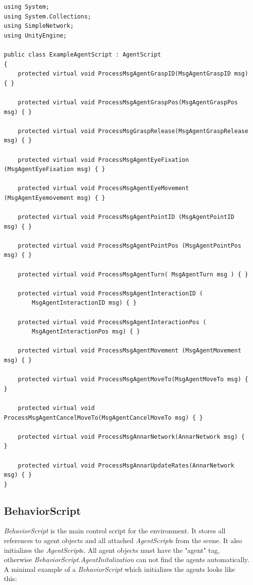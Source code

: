 \documentclass[10pt,final]{scrreprt}
\begin{document}
\begin{lstlisting}
using System;
using System.Collections;
using SimpleNetwork;
using UnityEngine;

public class ExampleAgentScript : AgentScript
{
	protected virtual void ProcessMsgAgentGraspID(MsgAgentGraspID msg) { }

	protected virtual void ProcessMsgAgentGraspPos(MsgAgentGraspPos msg) { }

	protected virtual void ProcessMsgGraspRelease(MsgAgentGraspRelease msg) { }

	protected virtual void ProcessMsgAgentEyeFixation (MsgAgentEyeFixation msg) { }

	protected virtual void ProcessMsgAgentEyeMovement (MsgAgentEyemovement msg) { }
	
	protected virtual void ProcessMsgAgentPointID (MsgAgentPointID msg) { }

	protected virtual void ProcessMsgAgentPointPos (MsgAgentPointPos msg) { }

	protected virtual void ProcessMsgAgentTurn( MsgAgentTurn msg ) { }

	protected virtual void ProcessMsgAgentInteractionID (
		MsgAgentInteractionID msg) { }

	protected virtual void ProcessMsgAgentInteractionPos (
		MsgAgentInteractionPos msg) { }

	protected virtual void ProcessMsgAgentMovement (MsgAgentMovement msg) { }

	protected virtual void ProcessMsgAgentMoveTo(MsgAgentMoveTo msg) { }

	protected virtual void ProcessMsgAgentCancelMoveTo(MsgAgentCancelMoveTo msg) { }
	  
	protected virtual void ProcessMsgAnnarNetwork(AnnarNetwork msg) { }

	protected virtual void ProcessMsgAnnarUpdateRates(AnnarNetwork msg) { }
}
\end{lstlisting}
\subsection{BehaviorScript}

\emph{BehaviorScript} is the main control script for the environment. It stores all references to agent objects and all attached \emph{AgentScript}s from the scene. It also initializes the \emph{AgentScript}s. All agent objects must have the "agent" tag, otherwise \emph{BehaviorScript.AgentInitalization} can not find the agents automatically.
A minimal example of a \emph{BehaviorScript} which initializes the agents looks like this: 
\end{document}
